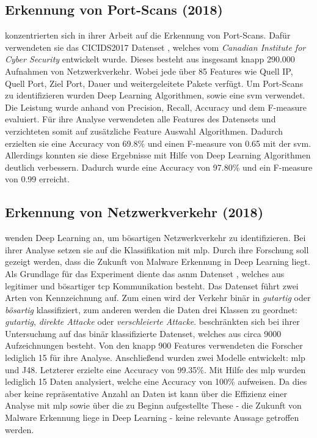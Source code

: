 \documentclass[
    12pt, %
    DIV10,
    ngerman, %
    a4paper, %
    oneside, %
    titlepage, %
    parskip=half, %
    headings=normal, %
    listof=totoc, %
    bibliography=totoc, %
    index=totoc, %
    captions=tableheading, %
    final %
]{scrreprt}
\begin{document}
\subsection{Erkennung von Port-Scans (2018)}
\textcite{Aksu2019} konzentrierten sich in ihrer Arbeit auf die Erkennung von Port-Scans. Dafür verwendeten sie das CICIDS2017 Datenset \parencite{Sharafaldin2018}, welches vom \emph{Canadian Institute for Cyber Security} entwickelt wurde. Dieses besteht aus insgesamt knapp 290.000 Aufnahmen von Netzwerkverkehr. Wobei jede über 85 Features wie Quell IP, Quell Port, Ziel Port, Dauer und weitergeleitete Pakete verfügt. Um Port-Scans zu identifizieren wurden Deep Learning Algorithmen, sowie eine \ac{svm} verwendet. Die Leistung wurde anhand von Precision, Recall, Accuracy und dem F-measure evaluiert. Für ihre Analyse verwendeten  \textcite{Aksu2019} alle Features des Datensets und verzichteten somit auf zusätzliche Feature Auswahl Algorithmen. Dadurch erzielten sie eine Accuracy von 69.8\% und einen F-measure von 0.65 mit der \ac{svm}. Allerdings konnten sie diese Ergebnisse mit Hilfe von Deep Learning Algorithmen deutlich verbessern. Dadurch wurde eine Accuracy von 97.80\% und ein F-measure von 0.99 erreicht.
%
\subsection{Erkennung von Netzwerkverkehr (2018)}\label{asnm}
\textcite{Teoh2018} wenden Deep Learning an, um bösartigen Netzwerkverkehr zu identifizieren. Bei ihrer Analyse setzen sie auf die Klassifikation mit \ac{mlp}. Durch ihre Forschung soll gezeigt werden, dass die Zukunft von Malware Erkennung in Deep Learning liegt. Als Grundlage für das Experiment diente das \ac{asnm} Datenset \parencite{phdthesis}, welches aus legitimer und bösartiger \ac{tcp} Kommunikation besteht. Das Datenset führt zwei Arten von Kennzeichnung auf. Zum einen wird der Verkehr binär in \emph{gutartig} oder \emph{bösartig} klassifiziert, zum anderen werden die Daten drei Klassen zu geordnet: \emph{gutartig}, \emph{direkte Attacke} oder \emph{verschleierte Attacke}. \textcite{Teoh2018} beschränkten sich bei ihrer Untersuchung auf das binär klassifizierte Datenset, welches aus circa 9000 Aufzeichnungen besteht. Von den knapp 900 Features verwendeten die Forscher lediglich 15 für ihre Analyse. Anschlie{\ss}end wurden zwei Modelle entwickelt: \ac{mlp} und J48. Letzterer erzielte eine Accuracy von 99.35\%. Mit Hilfe des \ac{mlp} wurden lediglich 15 Daten analysiert, welche eine Accuracy von 100\% aufweisen. Da dies aber keine repräsentative Anzahl an Daten ist kann über die Effizienz einer Analyse mit \ac{mlp} sowie über die zu Beginn aufgestellte These - die Zukunft von Malware Erkennung liege in Deep Learning - keine relevante Aussage getroffen werden. 
%
\end{document}
